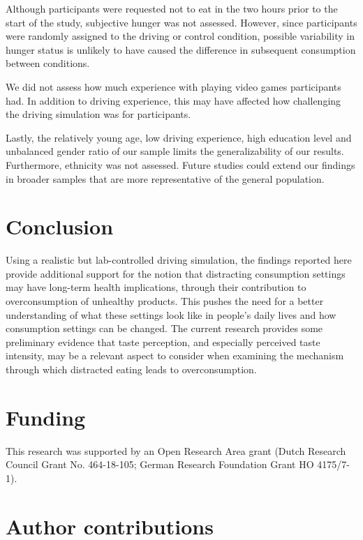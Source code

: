 \documentclass[authordate, empirical, issue]{jote-new-article}
\begin{document}
Although participants were requested not to eat in the two hours prior to the start of the study, subjective hunger was not assessed. However, since participants were randomly assigned to the driving or control condition, possible variability in hunger status is unlikely to have caused the difference in subsequent consumption between conditions.



We did not assess how much experience with playing video games participants had. In addition to driving experience, this may have affected how challenging the driving simulation was for participants.



Lastly, the relatively young age, low driving experience, high education level and unbalanced gender ratio of our sample limits the generalizability of our results. Furthermore, ethnicity was not assessed. Future studies could extend our findings in broader samples that are more representative of the general population.

\section{Conclusion}



Using a realistic but lab-controlled driving simulation, the findings reported here provide additional support for the notion that distracting consumption settings may have long-term health implications, through their contribution to overconsumption of unhealthy products. This pushes the need for a better understanding of what these settings look like in people’s daily lives and how consumption settings can be changed. The current research provides some preliminary evidence that taste perception, and especially perceived taste intensity, may be a relevant aspect to consider when examining the mechanism through which distracted eating leads to overconsumption.

\section{Funding}
This research was supported by an Open Research Area grant (Dutch Research Council Grant No. 464-18-105; German Research Foundation Grant HO 4175/7-1).


\section{Author contributions}
\end{document}
